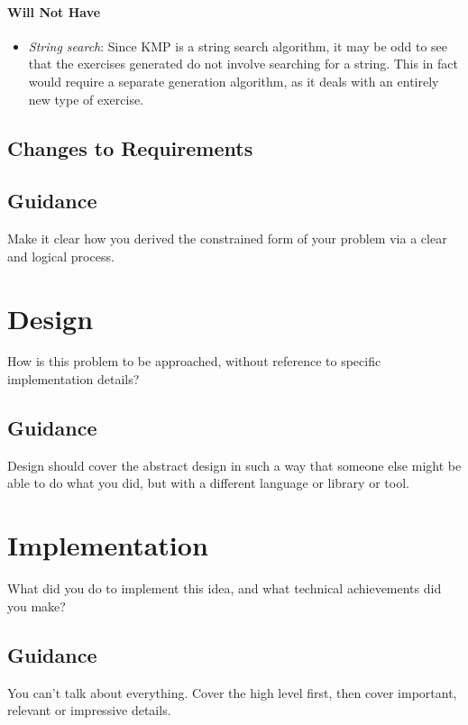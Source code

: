 \documentclass{l4proj}
\begin{document}
\subsubsection{Will Not Have}
\begin{itemize}
	\item
	\emph{String search}: Since KMP is a string search algorithm, it may be odd to see that the exercises generated do not involve searching for a string. This in fact would require a separate generation algorithm, as it deals with an entirely new type of exercise.
\end{itemize}
\section{Changes to Requirements}



\section{Guidance}
Make it clear how you derived the constrained form of your problem via a clear and logical process. 

\chapter{Design}
\label{chap:des}
How is this problem to be approached, without reference to specific implementation details? 
\section{Guidance}
Design should cover the abstract design in such a way that someone else might be able to do what you did, but with a different language or library or tool.

\chapter{Implementation}
\label{chap:imp}
What did you do to implement this idea, and what technical achievements did you make?
\section{Guidance}
You can't talk about everything. Cover the high level first, then cover important, relevant or impressive details.
\end{document}
